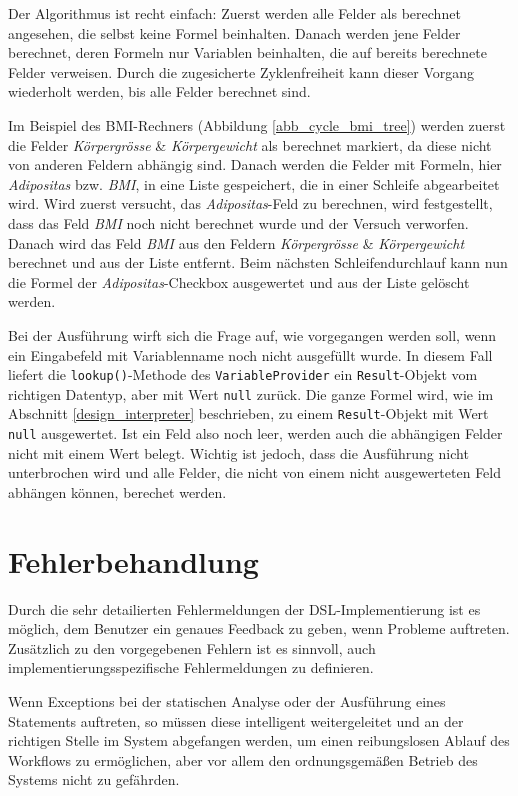 Der Algorithmus ist recht einfach: Zuerst werden alle Felder als berechnet angesehen, die selbst keine Formel beinhalten. Danach werden jene Felder berechnet, deren Formeln nur Variablen beinhalten, die auf bereits berechnete Felder verweisen. Durch die zugesicherte Zyklenfreiheit kann dieser Vorgang wiederholt werden, bis alle Felder berechnet sind.

Im Beispiel des BMI-Rechners (Abbildung \ref{abb_cycle_bmi_tree}) werden zuerst die Felder \emph{Körpergrösse} \& \emph{Körpergewicht} als berechnet markiert, da diese nicht von anderen Feldern abhängig sind. Danach werden die Felder mit Formeln, hier \emph{Adipositas} bzw. \emph{BMI}, in eine Liste gespeichert, die in einer Schleife abgearbeitet wird. Wird zuerst versucht, das \emph{Adipositas}-Feld zu berechnen, wird festgestellt, dass das Feld \emph{BMI} noch nicht berechnet wurde und der Versuch verworfen. Danach wird das Feld \emph{BMI} aus den Feldern \emph{Körpergrösse} \& \emph{Körpergewicht} berechnet und aus der Liste entfernt. Beim nächsten Schleifendurchlauf kann nun die Formel der \emph{Adipositas}-Checkbox ausgewertet und aus der Liste gelöscht werden.

Bei der Ausführung wirft sich die Frage auf, wie vorgegangen werden soll, wenn ein Eingabefeld mit Variablenname noch nicht ausgefüllt wurde. In diesem Fall liefert die \texttt{lookup()}-Methode des \texttt{VariableProvider} ein \texttt{Result}-Objekt vom richtigen Datentyp, aber mit Wert \texttt{null} zurück. Die ganze Formel wird, wie im Abschnitt \ref{design_interpreter} beschrieben, zu einem \texttt{Result}-Objekt mit Wert \texttt{null} ausgewertet. Ist ein Feld also noch leer, werden auch die abhängigen Felder nicht mit einem Wert belegt. Wichtig ist jedoch, dass die Ausführung nicht unterbrochen wird und alle Felder, die nicht von einem nicht ausgewerteten Feld abhängen können, berechet werden.



\section{Fehlerbehandlung}
\label{integration_fehlerbehandlung}

Durch die sehr detailierten Fehlermeldungen der DSL-Implementierung ist es möglich, dem Benutzer ein genaues Feedback zu geben, wenn Probleme auftreten. Zusätzlich zu den vorgegebenen Fehlern ist es sinnvoll, auch implementierungsspezifische Fehlermeldungen zu definieren.

Wenn Exceptions bei der statischen Analyse oder der Ausführung eines Statements auftreten, so müssen diese intelligent weitergeleitet und an der richtigen Stelle im System abgefangen werden, um einen reibungslosen Ablauf des Workflows zu ermöglichen, aber vor allem den ordnungsgemäßen Betrieb des Systems nicht zu gefährden.

